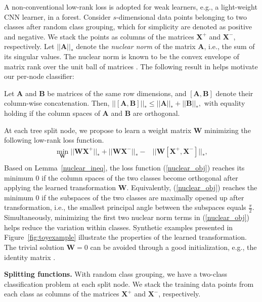 \documentclass[runningheads]{llncs}
\begin{document}
A  non-conventional low-rank loss is adopted
for weak learners, e.g., a light-weight CNN learner, in a forest.  Consider $s$-dimensional data points belonging
to two classes after random class grouping, which for simplicity are denoted as
positive and negative. We stack the points as columns of the matrices
$\mathbf{X}^+$ and $\mathbf{X}^-$, respectively.  Let $||\mathbf{A}||_*$ denote
the \emph{nuclear norm} of the matrix $\mathbf{A}$, i.e., the sum of its
singular values. The nuclear norm is known to be the convex envelope of matrix
rank over the unit ball of matrices \cite{rank-min}. The following result in
\cite{lowrankT} helps motivate our per-node classifier:


\begin{lemma}  \label{nuclear_ineq}
Let $\mathbf{A}$ and $\mathbf{B}$ be matrices of the same row dimensions, and
$\mathbf{[A,B]}$ denote their column-wise concatenation. Then, $
||\mathbf{[\mathbf{A},\mathbf{B}]}||_* \le ||\mathbf{A}||_* + ||\mathbf{B}||_*,
$ with equality holding if the column spaces of $\mathbf{A}$ and $\mathbf{B}$
are orthogonal.
\end{lemma}


At each tree split node, we propose to learn a
weight matrix $\mathbf{W}$  minimizing
the following low-rank loss function.
\begin{align} \label{nuclear_obj} \nonumber
\underset{\mathbf{W}} \min ||\mathbf{W X}^+||_* + ||\mathbf{W X}^-||_* -& ||\mathbf{W [X^+, X^-]}||_*,\\
\end{align}
Based on Lemma~\ref{nuclear_ineq}, the loss function (\ref{nuclear_obj}) reaches
its minimum $0$ if the column spaces of the two classes become orthogonal after
applying the learned transformation $\mathbf{W}$. Equivalently,
(\ref{nuclear_obj}) reaches the minimum $0$ if the subspaces of the two classes
are maximally opened up after transformation, i.e., the smallest principal angle
between the subspaces equals $\frac{\pi}{2}$. Simultaneously, minimizing the
first two nuclear norm terms in (\ref{nuclear_obj}) helps reduce the variation
within classes.  Synthetic examples presented in Figure~\ref{fig:toyexample}
illustrate the properties of the learned transformation.  The trivial solution
$\mathbf{W}=0$ can be avoided through a good initialization, e.g., the identity matrix \cite{lowrankT}.


\textbf{Splitting functions.}  With random class grouping, we have a two-class
classification problem at each split node.  We stack the training data points
from each class as columns of the matrices $\mathbf{X}^+$ and $\mathbf{X}^-$,
respectively.
\end{document}
